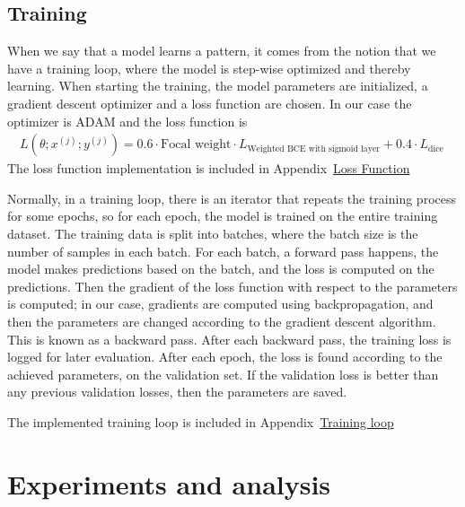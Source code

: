 \documentclass[a4paper,12pt]{article}
\begin{document}
\subsection{Training}
When we say that a model learns a pattern, it comes from the notion that we have a training loop, where the model is step-wise optimized and thereby learning.
When starting the training, the model parameters are initialized, a gradient descent optimizer and a loss function are chosen. In our case the optimizer is ADAM and the loss function is 
\begin{align}
L(\theta; x^{(j)}; y^{(j)}) = 0.6 \cdot \text{Focal weight} \cdot L_{\text{Weighted BCE with sigmoid layer}}+ 0.4 \cdot L_{\text {dice }}
\end{align}
The loss function implementation is included in Appendix~\hyperlink{sec:loss}{Loss Function}

Normally, in a training loop, there is an iterator that repeats the training process for some epochs, so for each epoch, the model is trained on the entire training dataset.
The training data is split into batches, where the batch size is the number of samples in each batch. For each batch, a forward pass happens, the model makes predictions based on the batch, and the loss is computed on the predictions.
Then the gradient of the loss function with respect to the parameters is computed; in our case, gradients are computed using backpropagation, and then the parameters are changed according to the gradient descent algorithm.
This is known as a backward pass. After each backward pass, the training loss is logged for later evaluation. After each epoch, the loss is found according to the achieved parameters, on the validation set.
If the validation loss is better than any previous validation losses, then the parameters are saved.

The implemented training loop is included in Appendix~\hyperlink{sec:training}{Training loop}


\section{Experiments and analysis}
\end{document}
